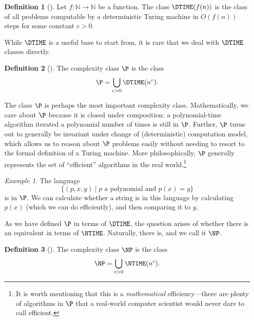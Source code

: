 \documentclass[english,12pt]{reedthesis}
\theoremstyle{plain}
\theoremstyle{definition}
\newtheorem{defn}[defn]{Definition}
\theoremstyle{remark}
\newtheorem{example}{Example}[thm]
\begin{document}
\begin{defn}[{\cite[Def.\ 1.19]{AB09}}]\label{def:dtime}
  Let $f\colon \mathbb{N} \rightarrow \mathbb{N}$ be a function. The class $\DTIME(f(n))$ is the class of all
  problems computable by a deterministic Turing machine in $O(f(n))$ steps for
  some constant $c > 0$.
\end{defn}

While $\DTIME$ is a useful base to start from, it is rare that we deal with
$\DTIME$ classes directly. %

\begin{defn}[{\cite[Def.\ 1.20]{AB09}}]\label{def:p}
  The complexity class $\P$ is the class
  \[
    \P = \bigcup_{c > 0}\DTIME(n^{c}).
  \]
\end{defn}

The class $\P$ is perhaps the most important complexity class. Mathematically,
we care about $\P$ because it is closed under composition: a polynomial-time
algorithm iterated a polynomial number of times is still in $\P$. Further, $\P$
turns out to generally be invariant under change of (deterministic) computation
model, which allows us to reason about $\P$ problems easily without needing to
resort to the formal definition of a Turing machine. More philosophically, $\P$
generally represents the set of ``efficient'' algorithms in the real
world.\footnote{It is worth mentioning that this is a \emph{mathematical}
  efficiency---there are plenty of algorithms in $\P$ that a real-world computer
  scientist would never dare to call efficient.}

\begin{example}\label{ex:polynomial-is-p}
  The language
  \[
    \{(p, x, y) \mid p \text{ a polynomial and } p(x) = y\}
  \]
  is in $\P$. We can calculate whether a string is in this language by
  calculating $p(x)$ (which we can do efficiently), and then comparing it to
  $y$.
\end{example}

As we have defined $\P$ in terms of $\DTIME$, the question arises of whether
there is an equivalent in terms of $\NTIME$. Naturally, there is, and we call it
$\NP$.

\begin{defn}[{\cite[Cor.\ 7.22]{Sip97}}]\label{def:np}
  The complexity class $\NP$ is the class
  \[
    \NP = \bigcup_{c > 0}\NTIME(n^{c}).
  \]
\end{defn}
\end{document}
